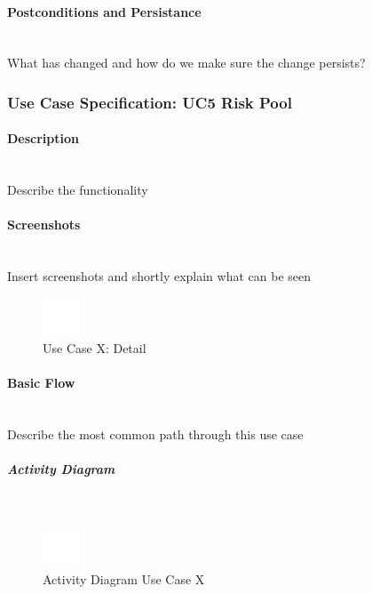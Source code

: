 \paragraph*{Postconditions and Persistance}\mbox{}\\
What has changed and how do we make sure the change persists?

\newpage
\subsubsection{Use Case Specification: \ac{UC}5 Risk Pool}
\label{sec:domainBbf}

\paragraph*{Description}\mbox{}\\
Describe the functionality

\paragraph*{Screenshots}\mbox{}\\
Insert screenshots and shortly explain what can be seen
\begin{figure}[h] 
	\centering
	\includegraphics[width=0.1\textwidth]{Content/Domain/placeholder.png}
	\caption{Use Case X: Detail}
	\label{fig:label5}
\end{figure}

\paragraph*{Basic Flow} \mbox{}\\

Describe the most common path through this use case

\subparagraph{Activity Diagram}\mbox{}\\
\begin{figure}[h]
	\centering
	\includegraphics[width=0.1\textwidth]{Content/Domain/placeholder.png}
	\caption{Activity Diagram Use Case X}
	\label{fig:label55}
\end{figure}

